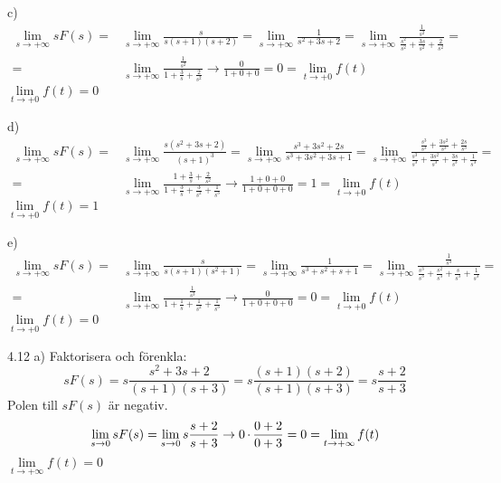 \begin{task}{c)}
	\begin{align*}
	\lim\limits_{s\rightarrow +\infty}sF(s)=
	&\lim\limits_{s\rightarrow +\infty}\frac{s}{s(s+1)(s+2)}=
	\lim\limits_{s\rightarrow +\infty}\frac{1}{s^2+3s+2}=
	\lim\limits_{s\rightarrow +\infty}\frac{\frac{1}{s^2}}{\frac{s^2}{s^2}+\frac{3s}{s^2}+\frac{2}{s^2}}= \\ =
	&\lim\limits_{s\rightarrow +\infty}\frac{\frac{1}{s^2}}{1+\frac{3}{s}+\frac{2}{s^2}}\rightarrow
	\frac{0}{1+0+0}=
	0=\lim\limits_{t\rightarrow +0}f(t)
	\end{align*}
	\ans $\lim\limits_{t\rightarrow +0}f(t)=0$
\end{task}

\begin{task}{d)}
	\begin{align*}
	\lim\limits_{s\rightarrow +\infty}sF(s)=
	&\lim\limits_{s\rightarrow +\infty}\frac{s(s^2+3s+2)}{(s+1)^3}=
	\lim\limits_{s\rightarrow +\infty}\frac{s^3+3s^2+2s}{s^3+3s^2+3s+1}=
	\lim\limits_{s\rightarrow +\infty}\frac{\frac{s^3}{s^3}+\frac{3s^2}{s^3}+\frac{2s}{s^3}}{\frac{s^3}{s^3}+\frac{3s^2}{s^3}+\frac{3s}{s^3}+\frac{1}{s^3}}= \\ =
	&\lim\limits_{s\rightarrow +\infty}\frac{1+\frac{3}{s}+\frac{2}{s^2}}{1+\frac{3}{s}+\frac{3}{s^2}+\frac{1}{s^3}}\rightarrow
	\frac{1+0+0}{1+0+0+0}=
	1=\lim\limits_{t\rightarrow +0}f(t)
	\end{align*}
	\ans $\lim\limits_{t\rightarrow +0}f(t)=1$
\end{task}

\begin{task}{e)}
	\begin{align*}
	\lim\limits_{s\rightarrow +\infty}sF(s)=
	&\lim\limits_{s\rightarrow +\infty}\frac{s}{s(s+1)(s^2+1)}=
	\lim\limits_{s\rightarrow +\infty}\frac{1}{s^3+s^2+s+1}=
	\lim\limits_{s\rightarrow +\infty}\frac{\frac{1}{s^3}}{\frac{s^3}{s^3}+\frac{s^2}{s^3}+\frac{s}{s^3}+\frac{1}{s^3}}= \\ =
	&\lim\limits_{s\rightarrow +\infty}\frac{\frac{1}{s^3}}{1+\frac{1}{s}+\frac{1}{s^2}+\frac{1}{s^3}}\rightarrow
	\frac{0}{1+0+0+0}=
	0=\lim\limits_{t\rightarrow +0}f(t)
	\end{align*}
	\ans $\lim\limits_{t\rightarrow +0}f(t)=0$
\end{task}

\begin{task}{4.12 a)}
	Faktorisera och förenkla:
	\[sF(s)=
	s\frac{s^2+3s+2}{(s+1)(s+3)}=
	s\frac{(s+1)(s+2)}{(s+1)(s+3)}=
	s\frac{s+2}{s+3}\]
	Polen till $sF(s)$ är negativ.
	\begin{align*}
	\lim\limits_{s\rightarrow 0}sF(s)=
	\lim\limits_{s\rightarrow 0}s\frac{s+2}{s+3}\rightarrow
	0\operatorname{\cdot}\frac{0+2}{0+3}=
	0=\lim\limits_{t\rightarrow +\infty}f(t)
	\end{align*}
	\ans $\lim\limits_{t\rightarrow +\infty}f(t)=0$
\end{task}

